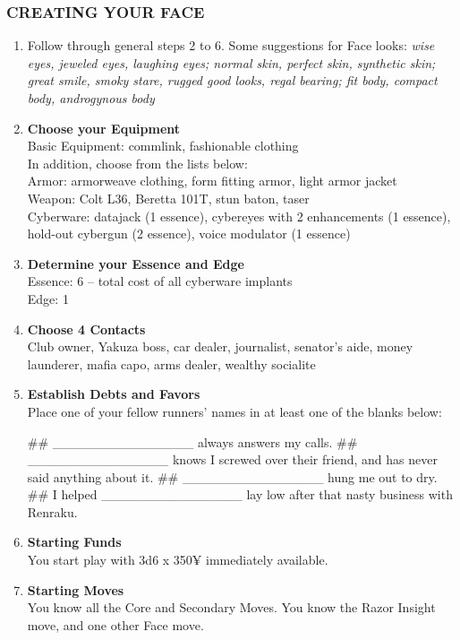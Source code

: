 \subsubsection{CREATING YOUR FACE}
\begin{enumerate}
    \item Follow through general steps 2 to 6. Some suggestions for Face looks: \textit{wise eyes, jeweled eyes, laughing eyes; normal skin, perfect skin, synthetic skin; great smile, smoky stare, rugged good looks, regal bearing; fit body, compact body, androgynous body}
    
    \item \textbf{Choose your Equipment} \\
    Basic Equipment: commlink, fashionable clothing \\
    In addition, choose from the lists below: \\
    Armor: armorweave clothing, form fitting armor, light armor jacket \\
    Weapon: Colt L36, Beretta 101T, stun baton, taser \\
    Cyberware: datajack (1 essence), cybereyes with 2 enhancements (1 essence), hold-out cybergun (2 essence), voice modulator (1 essence)
    
    \item \textbf{Determine your Essence and Edge} \\
    Essence: 6 – total cost of all cyberware implants \\
    Edge: 1
    
    \item \textbf{Choose 4 Contacts} \\
    Club owner, Yakuza boss, car dealer, journalist, senator’s aide, money launderer, mafia capo, arms dealer, wealthy socialite
    
    \item \textbf{Establish Debts and Favors} \\
    Place one of your fellow runners’ names in at least one of the blanks below:
        \begin{easylist}
            ## \_\_\_\_\_\_\_\_\_\_\_\_\_\_\_ always answers my calls.
            ## \_\_\_\_\_\_\_\_\_\_\_\_\_\_\_ knows I screwed over their friend, and has never said anything about it.
            ## \_\_\_\_\_\_\_\_\_\_\_\_\_\_\_ hung me out to dry.
            ## I helped \_\_\_\_\_\_\_\_\_\_\_\_\_\_\_ lay low after that nasty business with Renraku.
        \end{easylist}
    
    \item \textbf{Starting Funds} \\
    You start play with 3d6 x 350¥ immediately available.
    
    \item \textbf{Starting Moves} \\
    You know all the Core and Secondary Moves. You know the Razor Insight move, and one other Face move.
\end{enumerate}

